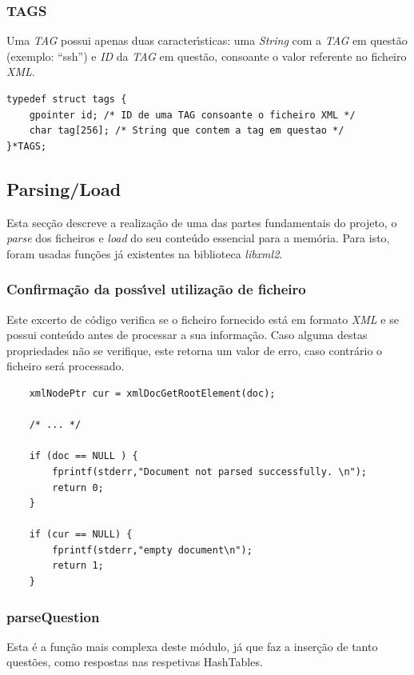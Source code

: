 \documentclass{article}
\begin{document}
\subsubsection{TAGS}
\par  Uma \emph{TAG} possui apenas duas caracter\'{\i}sticas: uma \emph{String} com a \emph{TAG} em quest\~{a}o (exemplo: \textquotedblleft{}ssh\textquotedblright{}) e \emph{ID} da \emph{TAG} em quest\~{a}o, consoante o valor referente no ficheiro \emph{XML}.

\begin{lstlisting}
typedef struct tags {
    gpointer id; /* ID de uma TAG consoante o ficheiro XML */
    char tag[256]; /* String que contem a tag em questao */
}*TAGS;
\end{lstlisting}

\clearpage

\subsection{Parsing/Load}
\quad Esta sec\c{c}\~{a}o descreve a realiza\c{c}\~{a}o de uma das partes fundamentais do projeto, o \emph{parse} dos ficheiros e \emph{load} do seu conte\'{u}do essencial  para a mem\'{o}ria. Para isto, foram usadas fun\c{c}\~{o}es j\'{a} existentes na biblioteca \emph{libxml2}. 

\subsubsection{Confirma\c{c}\~{a}o da poss\'{\i}vel utiliza\c{c}\~{a}o de ficheiro}
\par Este excerto de c\'{o}digo verifica se o ficheiro fornecido est\'{a} em formato \emph{XML} e se possui conte\'{u}do antes de processar a sua informa\c{c}\~{a}o. Caso alguma destas propriedades n\~{a}o se verifique, este retorna um valor de erro, caso contr\'{a}rio o ficheiro ser\'{a} processado. 

\begin{lstlisting}
    xmlNodePtr cur = xmlDocGetRootElement(doc);
    
    /* ... */
    
    if (doc == NULL ) {
        fprintf(stderr,"Document not parsed successfully. \n");
        return 0;
    }

    if (cur == NULL) {
        fprintf(stderr,"empty document\n");
        return 1;
    }
\end{lstlisting}

\subsubsection{parseQuestion}
\par Esta \'{e} a fun\c{c}\~{a}o mais complexa deste m\'{o}dulo, j\'{a} que faz a inser\c{c}\~{a}o de tanto quest\~{o}es, como respostas nas respetivas HashTables.
\end{document}
